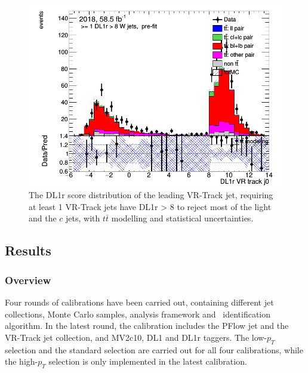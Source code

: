 \documentclass[letterpaper,12pt]{article}
\begin{document}
\begin{figure}[!h]
    \centering
\includegraphics[width=.45\textwidth]{FTAG_plots/3bplots/3bplots.png}
	\caption{The DL1r score distribution of the leading VR-Track jet, 
	requiring at least 1 VR-Track jets have DL1r > 8 to reject most of 
	the light and the $c$ jets, with $t\bar{t}$ modelling and statistical uncertainties. }
    \label{fig:3bplots}
\end{figure}


\subsection{Results}
\label{result}


\subsubsection{Overview}
Four rounds of calibrations have been carried out, containing different 
jet collections, Monte Carlo samples, analysis framework 
and \bjet\ identification algorithm. 
In the latest round, 
the calibration includes the PFlow jet and the VR-Track jet collection, 
and MV2c10, DL1 and DL1r taggers. The low-$p_T$ 
selection and the standard selection are carried out for all four 
calibrations, while the high-$p_T$ selection is only implemented 
in the latest calibration. 
\end{document}
